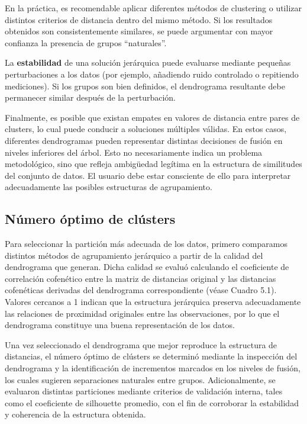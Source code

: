 \documentclass[
]{book}
\begin{document}
En la práctica, es recomendable aplicar diferentes métodos de clustering o utilizar distintos criterios de distancia dentro del mismo método. Si los resultados obtenidos son consistentemente similares, se puede argumentar con mayor confianza la presencia de grupos ``naturales''.

La \textbf{estabilidad} de una solución jerárquica puede evaluarse mediante pequeñas perturbaciones a los datos (por ejemplo, añadiendo ruido controlado o repitiendo mediciones). Si los grupos son bien definidos, el dendrograma resultante debe permanecer similar después de la perturbación.

Finalmente, es posible que existan empates en valores de distancia entre pares de clusters, lo cual puede conducir a soluciones múltiples válidas. En estos casos, diferentes dendrogramas pueden representar distintas decisiones de fusión en niveles inferiores del árbol. Esto no necesariamente indica un problema metodológico, sino que refleja ambigüedad legítima en la estructura de similitudes del conjunto de datos. El usuario debe estar consciente de ello para interpretar adecuadamente las posibles estructuras de agrupamiento.

\subsection{Número óptimo de clústers}\label{nuxfamero-uxf3ptimo-de-cluxfasters}

Para seleccionar la partición más adecuada de los datos, primero comparamos distintos métodos de agrupamiento jerárquico a partir de la calidad del dendrograma que generan. Dicha calidad se evaluó calculando el coeficiente de correlación cofenético entre la matriz de distancias original y las distancias cofenéticas derivadas del dendrograma correspondiente (véase Cuadro 5.1). Valores cercanos a 1 indican que la estructura jerárquica preserva adecuadamente las relaciones de proximidad originales entre las observaciones, por lo que el dendrograma constituye una buena representación de los datos.

Una vez seleccionado el dendrograma que mejor reproduce la estructura de distancias, el número óptimo de clústers se determinó mediante la inspección del dendrograma y la identificación de incrementos marcados en los niveles de fusión, los cuales sugieren separaciones naturales entre grupos. Adicionalmente, se evaluaron distintas particiones mediante criterios de validación interna, tales como el coeficiente de silhouette promedio, con el fin de corroborar la estabilidad y coherencia de la estructura obtenida.
\end{document}
